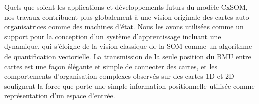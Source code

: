 Quels que soient les applications et développements futurs du modèle CxSOM, nos travaux contribuent plus globalement à une vision originale des cartes auto-organisatrices comme des machines d'état.
Nous les avons utilisées comme un support pour la conception d'un système d'apprentissage incluant une dynamique, qui s'éloigne de la vision classique de la SOM comme un algorithme de quantification vectorielle.
La transmission de la seule position du BMU entre cartes est une façon élégante et simple de connecter des cartes, et les comportements d'organisation complexes observés sur des cartes 1D et 2D soulignent la force que porte une simple information positionnelle utilisée comme représentation d'un espace d'entrée.



